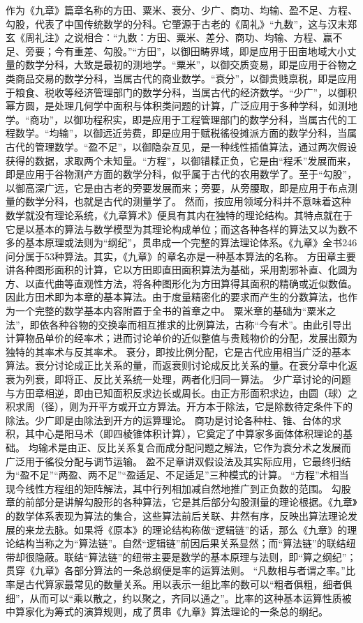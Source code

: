 \documentclass[a4paper,12pt,UTF8,twoside]{ctexbook}
\begin{document}
作为《九章》篇章名称的方田、粟米、衰分、少广、商功、均输、盈不足、方程、勾股，代表了中国传统数学的分科。它肇源于古老的《周礼》“九数”，这与汉末郑玄《周礼注》之说相合：“九数：方田、粟米、差分、商功、均输、方程、赢不足、旁要；今有重差、勾股。”“方田”，以御田畴界域，即是应用于田亩地域大小丈量的数学分科，大致是最初的测地学。“粟米”，以御交质变易，即是应用于谷物之类商品交易的数学分科，当属古代的商业数学。“衰分”，以御贵贱禀税，即是应用于粮食、税收等经济管理部门的数学分科，当属古代的经济数学。“少广”，以御积幂方圆，是处理几何学中面积与体积类问题的计算，广泛应用于多种学科，如测地学。“商功”，以御功程积实，即是应用于工程管理部门的数学分科，当属古代的工程数学。“均输”，以御远近劳费，即是应用于赋税徭役摊派方面的数学分科，当属古代的管理数学。“盈不足”，以御隐杂互见，是一种线性插值算法，通过两次假设获得的数据，求取两个未知量。“方程”，以御错糅正负，它是由“程禾”发展而来，即是应用于谷物测产方面的数学分科，似乎属于古代的农用数学了。至于“勾股”，以御高深广远，它是由古老的旁要发展而来；旁要，从旁腰取，即是应用于布点测量的数学分科，也就是古代的测量学了。
然而，按应用领域分科并不意味着这种数学就没有理论系统，《九章算术》便具有其内在独特的理论结构。其特点就在于它是以基本的算法与数学模型为其理论构成单位；而这各种各样的算法又以为数不多的基本原理或法则为“纲纪”，贯串成一个完整的算法理论体系。《九章》全书246问分属于53种算法。其实，《九章》的章名亦是一种基本算法的名称。
方田章主要讲各种图形面积的计算，它以方田即直田面积算法为基础，采用割邪补直、化圆为方、以直代曲等直观性方法，将各种图形化为方田算得其面积的精确或近似数值。因此方田术即为本章的基本算法。由于度量精密化的要求而产生的分数算法，也作为一个完整的数学基本内容附置于全书的首章之中。
粟米章的基础为“粟米之法”，即依各种谷物的交换率而相互推求的比例算法，古称“今有术”。由此引导出计算物品单价的经率术；进而讨论单价的近似整值与贵贱物价的分配，发展出颇为独特的其率术与反其率术。
衰分，即按比例分配，它是古代应用相当广泛的基本算法。衰分讨论成正比关系的量，而返衰则讨论成反比关系的量。在衰分章中化返衰为列衰，即将正、反比关系统一处理，两者化归同一算法。
少广章讨论的问题与方田章相逆，即由已知面积反求边长或周长。由正方形面积求边，由圆（球）之积求周（径），则为开平方或开立方算法。开方本于除法，它是除数待定条件下的除法。少广即是由除法到开方的运算理论。
商功是讨论各种柱、锥、台体的求积，其中心是阳马术（即四棱锥体积计算），它奠定了中算家多面体体积理论的基础。
均输术是由正、反比关系复合而成分配问题之解法，它作为衰分术之发展而广泛用于徭役分配与调节运输。
盈不足章讲双假设法及其实际应用，它最终归结为“盈不足”“两盈、两不足”“盈适足、不足适足”三种模式的计算。
“方程”术相当现今线性方程组的矩阵解法，其中行列相加减自然地推广到正负数的范围。
勾股章的前部分是讲解勾股形的各种算法，它是其后部分勾股测量的理论根据。《九章》的数学体系表现为算法的集合，这些算法前后关联、井然有序，反映出算法理论发展的来龙去脉。如果将《原本》的理论结构称做“逻辑链”的话，那么《九章》的理论结构当称之为“算法链”。自然“逻辑链”前因后果关系显然；而“算法链”的联结纽带却很隐蔽。联结“算法链”的纽带主要是数学的基本原理与法则，即“算之纲纪”；贯穿《九章》各部分算法的一条总纲便是率的运算法则。
“凡数相与者谓之率。”比率是古代算家最常见的数量关系。用以表示一组比率的数可以“粗者俱粗，细者俱细”，从而可以“乘以散之，约以聚之，齐同以通之”。比率的这种基本运算性质被中算家化为筹式的演算规则，成了贯串《九章》算法理论的一条总的纲纪。
\end{document}
